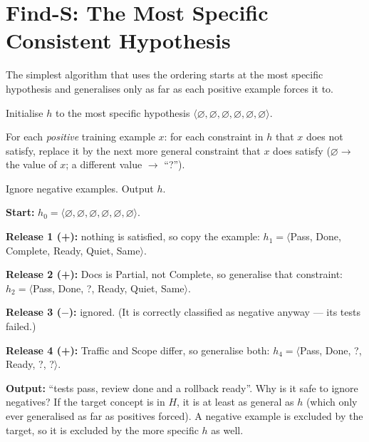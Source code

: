 \section{Find-S: The Most Specific Consistent Hypothesis}

The simplest algorithm that uses the ordering starts at the most specific
hypothesis and generalises only as far as each positive example forces it to.

\begin{definitionbox}
\begin{tightnum}
  \item Initialise $h$ to the most specific hypothesis
        $\langle\varnothing, \varnothing, \varnothing, \varnothing, \varnothing,
        \varnothing\rangle$.
  \item For each \emph{positive} training example $x$: for each constraint in
        $h$ that $x$ does not satisfy, replace it by the next more general
        constraint that $x$ does satisfy ($\varnothing \to$ the value of $x$;
        a different value $\to$ ``?'').
  \item Ignore negative examples. Output $h$.
\end{tightnum}
\end{definitionbox}

\begin{worked}
\textbf{Start:} $h_0 = \langle\varnothing, \varnothing, \varnothing, \varnothing,
\varnothing, \varnothing\rangle$.

\textbf{Release 1 (+):} nothing is satisfied, so copy the example:
$h_1 = \langle$Pass, Done, Complete, Ready, Quiet, Same$\rangle$.

\textbf{Release 2 (+):} Docs is Partial, not Complete, so generalise that
constraint: $h_2 = \langle$Pass, Done, ?, Ready, Quiet, Same$\rangle$.

\textbf{Release 3 ($-$):} ignored. (It is correctly classified as negative anyway
--- its tests failed.)

\textbf{Release 4 (+):} Traffic and Scope differ, so generalise both:
$h_4 = \langle$Pass, Done, ?, Ready, ?, ?$\rangle$.

\smallskip
\textbf{Output:} ``tests pass, review done and a rollback ready''. Why is it safe
to ignore negatives? If the target concept is in $H$, it is at least as general as
$h$ (which only ever generalised as far as positives forced). A negative example
is excluded by the target, so it is excluded by the more specific $h$ as well.
\end{worked}

